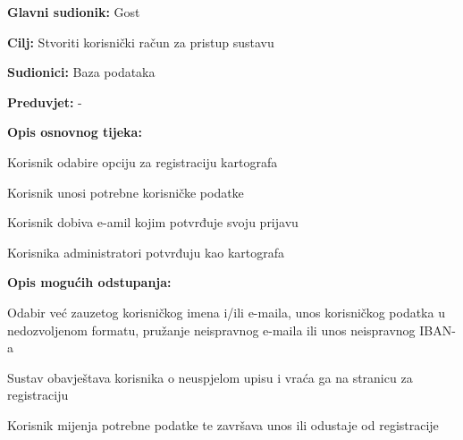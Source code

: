 					\noindent {}
					\begin{packed_item}
	
						\item \textbf{Glavni sudionik: }Gost
						\item  \textbf{Cilj:} Stvoriti korisnički račun za pristup sustavu
						\item  \textbf{Sudionici:} Baza podataka
						\item  \textbf{Preduvjet:} -
						\item  \textbf{Opis osnovnog tijeka:}
						
						\item[] \begin{packed_enum}
	
							\item Korisnik odabire opciju za registraciju kartografa
							\item Korisnik unosi potrebne korisničke podatke
							\item Korisnik dobiva e-amil kojim potvrđuje svoju prijavu
							\item Korisnika administratori potvrđuju kao kartografa

						\end{packed_enum}
						
						\item  \textbf{Opis mogućih odstupanja:}
						
						\item[] \begin{packed_item}
	
							\item[2.a] Odabir već zauzetog korisničkog imena i/ili e-maila, unos korisničkog podatka u nedozvoljenom formatu, pružanje neispravnog e-maila ili unos neispravnog IBAN-a
							\item[] \begin{packed_enum}
								
								\item Sustav obavještava korisnika o neuspjelom upisu i vraća ga na stranicu za registraciju
								\item Korisnik mijenja potrebne podatke te završava unos ili odustaje od registracije
								
							\end{packed_enum}
							
						\end{packed_item}
					\end{packed_item}
				

